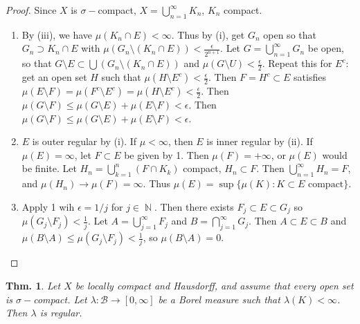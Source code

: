 \documentclass[12pt, a4paper]{book}
\DeclareMathOperator{\N}{\mathbb{N}}
\newtheorem{theorem}{Thm.}[section]
\theoremstyle{nonumberplain}
\newtheorem{proof}{Proof}
\begin{document}
\begin{proof}
    Since $X$ is $\sigma-$compact, $X=\bigcup\limits_{n=1}^\infty K_n$, $K_n$ compact.
    \begin{enumerate}
        \item By (iii), we have $\mu(K_n\cap E)<\infty$.
            Thus by (i), get $G_n$ open so that $G_n\supset K_n\cap E$ with $\mu(G_n\setminus(K_n\cap E))<\frac{\epsilon}{2^{n+1}}$.
            Let $G=\bigcup\limits_{n=1}^\infty G_n$ be open, so that $G\setminus E\subset\bigcup(G_n\setminus(K_n\cap E))$ and $\mu(G\setminus U)<\frac{\epsilon}{2}$.
            Repeat this for $E^c$: get an open set $H$ such that $\mu(H\setminus E^c)<\frac{\epsilon}{2}$.
            Then $F=H^c\subset E$ satisfies $\mu(E\setminus F)=\mu(F^c\setminus E^c)=\mu(H\setminus E^c)<\frac{\epsilon}{2}$.
            Then $\mu(G\setminus F)\leq\mu(G\setminus E)+\mu(E\setminus F)<\epsilon$.
            Then $\mu(G\setminus F)\leq\mu(G\setminus E)+\mu(E\setminus F)<\epsilon$.
        \item $E$ is outer regular by (i).
            If $\mu<\infty$, then $E$ is inner regular by (ii).
            If $\mu(E)=\infty$, let $F\subset E$ be given by 1.
            Then $\mu(F)=+\infty$, or $\mu(E)$ would be finite.
            Let $H_n=\bigcup\limits_{k=1}^n(F\cap K_k)$ compact, $H_n\subset F$.
            Then $\bigcup\limits_{n=1}^\infty H_n=F$, and $\mu(H_n)\to\mu(F)=\infty$.
            Thus $\mu(E)=\sup\{\mu(K):K\subset E\text{ compact}\}$.
        \item Apply 1 wih $\epsilon=1/j$ for $j\in\N$.
            Then there exists $F_j\subset E\subset G_j$ so $\mu(G_j\setminus F_j)<\frac{1}{j}$.
            Let $A=\bigcup\limits_{j=1}^\infty F_j$ and $B=\bigcap\limits_{j=1}^\infty G_j$.
            Then $A\subset E\subset B$ and $\mu(B\setminus A)\leq\mu(G_j\setminus F_j)<\frac{1}{j}$, so $\mu(B\setminus A)=0$.
    \end{enumerate}
\end{proof}
\begin{theorem}
    Let $X$ be locally compact and Hausdorff, and assume that every open set is $\sigma-$compact.
    Let $\lambda:\mathcal{B}\to[0,\infty]$ be a Borel measure such that $\lambda(K)<\infty$.
    Then $\lambda$ is regular.
\end{theorem}
\end{document}
